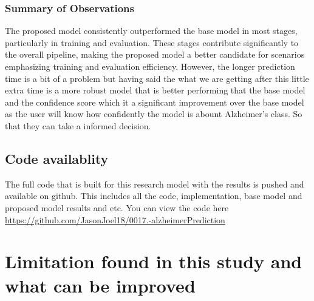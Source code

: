 \documentclass[12pt,onecolumn]{report}
\begin{document}
\subsection{Summary of Observations}
The proposed model consistently outperformed the base model in most stages, particularly in training and evaluation. These stages contribute significantly to the overall pipeline, making the proposed model a better candidate for scenarios emphasizing training and evaluation efficiency. However, the longer prediction time is a bit of a problem but having said the what we are getting after this little extra time is a more robust model that is better performing that the base model and the confidence score which it a significant improvement over the base model as the user will know how confidently the model is abount Alzheimer's class. So that they can take a informed decision.

\section{Code availablity}
The full code that is built for this research model with the results is pushed and available on github. This includes all the code, implementation, base model and proposed model results and etc. You can view the code here \url{https://github.com/JasonJoel18/0017.-alzheimerPrediction}


\chapter{Limitation found in this study and what can be improved}
\end{document}
